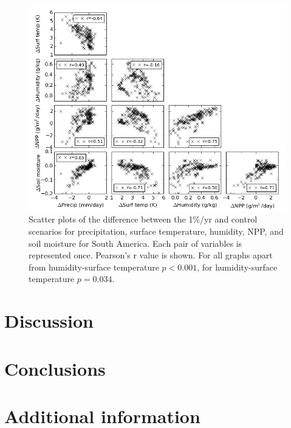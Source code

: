\documentclass{article}
\begin{document}
\begin{figure}[hbp]
    \centering
    \includegraphics[width=\textwidth]{figures/corr}
    \caption{Scatter plots of the difference between the 1\%/yr and control scenarios for precipitation, surface temperature, humidity, NPP, and soil moisture for South America. Each pair of variables is represented once. Pearson's r value is shown. For all graphs apart from humidity-surface temperature $p < 0.001$, for humidity-surface temperature $p = 0.034$. }
    \label{fig:corr}
\end{figure}

\newpage
\section{Discussion}

\section{Conclusions}

\printbibliography
\appendix 

\section{Additional information}
\end{document}
